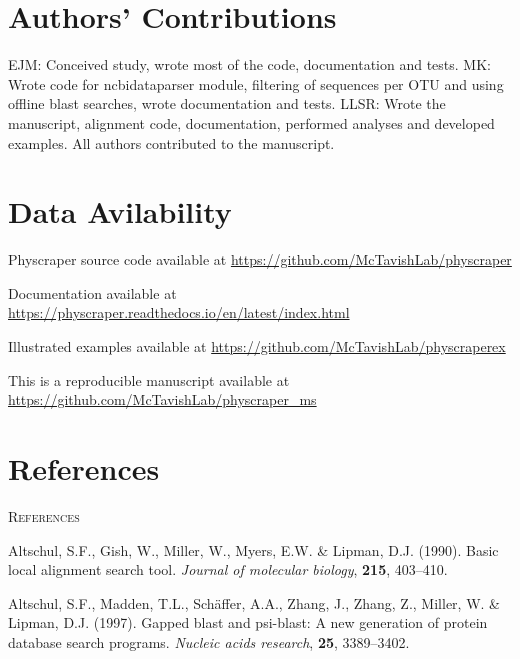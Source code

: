 \documentclass[]{article}
\begin{document}
\hypertarget{authors-contributions}{%
\section{Authors' Contributions}\label{authors-contributions}}

EJM: Conceived study, wrote most of the code, documentation and tests.
MK: Wrote code for ncbidataparser module, filtering of sequences per OTU and using offline blast searches, wrote documentation and tests.
LLSR: Wrote the manuscript, alignment code, documentation, performed analyses and developed examples.
All authors contributed to the manuscript.

\hypertarget{data-avilability}{%
\section{Data Avilability}\label{data-avilability}}

Physcraper source code available at \url{https://github.com/McTavishLab/physcraper}

Documentation available at \url{https://physcraper.readthedocs.io/en/latest/index.html}

Illustrated examples available at \url{https://github.com/McTavishLab/physcraperex}

This is a reproducible manuscript available at \url{https://github.com/McTavishLab/physcraper_ms}

\newpage

\hypertarget{references}{%
\section{References}\label{references}}

\newpage
\begin{center}
\textsc{References}
\end{center}

\hypertarget{refs}{}
\leavevmode\hypertarget{ref-altschul1990basic}{}%
Altschul, S.F., Gish, W., Miller, W., Myers, E.W. \& Lipman, D.J. (1990). Basic local alignment search tool. \emph{Journal of molecular biology}, \textbf{215}, 403--410.

\leavevmode\hypertarget{ref-altschul1997gapped}{}%
Altschul, S.F., Madden, T.L., Schäffer, A.A., Zhang, J., Zhang, Z., Miller, W. \& Lipman, D.J. (1997). Gapped blast and psi-blast: A new generation of protein database search programs. \emph{Nucleic acids research}, \textbf{25}, 3389--3402.
\end{document}
